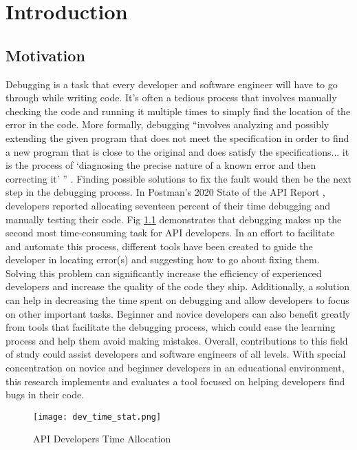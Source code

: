 \chapter{Introduction}
\label{ch:intro}

\section{Motivation}
\label{sec:motivation}

Debugging is a task that every developer and software engineer will have to go
through while writing code. It's often a
tedious process that involves manually checking the code and running it multiple
times to simply find the location of the error in the code. More formally,
debugging ``involves analyzing and possibly extending the given program that
does not meet the specification in order to find a new program that is close to
the original and does satisfy the specifications... it is the process of
`diagnosing the precise nature of a known error and then correcting it' '' \cite{Hailpern2002Debugging}.
Finding possible solutions to fix the fault would then be the next step
in the debugging process. In Postman's 2020 State of the API Report \cite{2020_state_of_api_report},
developers reported allocating seventeen percent of their time
debugging and manually testing their code.
Fig \ref{fig:development_time} demonstrates that debugging makes up the
second most time-consuming task for API developers.
In an effort to facilitate and automate this process, different tools have been
created to guide the developer in locating error(s) and suggesting how to go
about fixing them. Solving this problem can significantly increase the
efficiency of experienced developers and increase the quality of the code they
ship. Additionally, a solution can help in decreasing the time spent on
debugging and allow developers to focus on other important tasks.
Beginner and novice developers can also benefit greatly from tools
that facilitate the debugging process, which could ease the learning process and help
them avoid making mistakes. Overall, contributions to this field of study could
assist developers and software engineers of all levels.
With special concentration on novice and beginner developers in an educational
environment, this research implements and evaluates a tool focused on helping
developers find bugs in their code.

\begin{figure}[!htb]
	\begin{center}
		\texttt{[image: dev\_time\_stat.png]}
		\caption{\label{fig:development_time} API Developers Time Allocation\cite{2020_state_of_api_report}}
	\end{center}
\end{figure}


